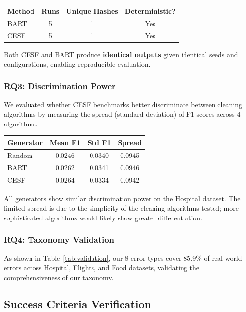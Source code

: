 \documentclass[11pt,a4paper]{article}
\begin{document}
\begin{table}[h]
\centering
\begin{tabular}{lccc}
\toprule
Method & Runs & Unique Hashes & Deterministic? \\
\midrule
BART & 5 & 1 & Yes \\
CESF & 5 & 1 & Yes \\
\bottomrule
\end{tabular}
\end{table}

Both CESF and BART produce \textbf{identical outputs} given identical seeds and configurations, enabling reproducible evaluation.

\subsubsection{RQ3: Discrimination Power}

We evaluated whether CESF benchmarks better discriminate between cleaning algorithms by measuring the spread (standard deviation) of F1 scores across 4 algorithms.

\begin{table}[h]
\centering
\begin{tabular}{lccc}
\toprule
Generator & Mean F1 & Std F1 & Spread \\
\midrule
Random & 0.0246 & 0.0340 & 0.0945 \\
BART & 0.0262 & 0.0341 & 0.0946 \\
CESF & 0.0264 & 0.0334 & 0.0942 \\
\bottomrule
\end{tabular}
\end{table}

All generators show similar discrimination power on the Hospital dataset. The limited spread is due to the simplicity of the cleaning algorithms tested; more sophisticated algorithms would likely show greater differentiation.

\subsubsection{RQ4: Taxonomy Validation}

As shown in Table~\ref{tab:validation}, our 8 error types cover 85.9\% of real-world errors across Hospital, Flights, and Food datasets, validating the comprehensiveness of our taxonomy.

\subsection{Success Criteria Verification}
\end{document}
